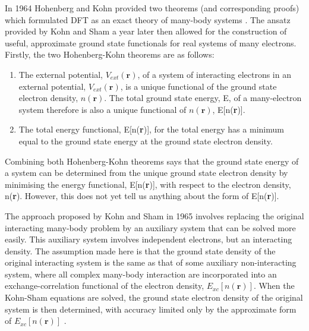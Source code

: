 \documentclass[11pt, twoside]{report}
\begin{document}
In 1964 Hohenberg and Kohn provided two theorems (and corresponding proofs) which formulated DFT as an exact theory of many-body systems \cite{hohenberg_kohn1964}. The ansatz provided by Kohn and Sham a year later \cite{Kohn_Sham1965} then allowed for the construction of useful, approximate ground state functionals for real systems of many electrons. Firstly, the two Hohenberg-Kohn theorems are as follows:
\begin{enumerate}
\item The external potential, $V_{ext}(\mathbf{r})$, of a system of interacting electrons in an external potential, $V_{ext}(\mathbf{r})$, is a unique functional of the ground state electron density, $n(\mathbf{r})$. The total ground state energy, E, of a many-electron system therefore is also a unique functional of $n(\mathbf{r})$, E[n(\textbf{r})].
\item The total energy functional, E[n(\textbf{r})], for the total energy has a minimum equal to the ground state energy at the ground state electron density. 
\end{enumerate}
Combining both Hohenberg-Kohn theorems says that the ground state energy of a system can be determined from the unique ground state electron density by minimising the energy functional, E[n(\textbf{r})], with respect to the electron density, n(\textbf{r}). However, this does not yet tell us anything about the form of E[n(\textbf{r})]. 

The approach proposed by Kohn and Sham in 1965 involves replacing the original interacting many-body problem by an auxiliary system that can be solved more easily. This auxiliary system involves independent electrons, but an interacting density. The assumption made here is that the ground state density of the original interacting system is the same as that of some auxiliary non-interacting system, where all complex many-body interaction are incorporated into an exchange-correlation functional of the electron density, $E_{xc}[n(\mathbf{r})]$. When the Kohn-Sham equations are solved, the ground state electron density of the original system is then determined, with accuracy limited only by the approximate form of $E_{xc}[n(\mathbf{r})]$ \cite{RichardMartin_Ch7}.
\end{document}
